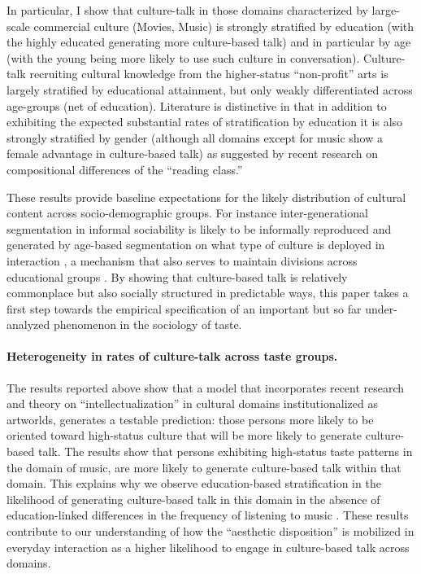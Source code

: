 In particular, I show that culture-talk in those domains characterized by large-scale commercial culture (Movies, Music) is strongly stratified by education (with the highly educated generating more culture-based talk) and in particular by age (with the young being more likely to use such culture in conversation). Culture-talk recruiting cultural knowledge from the higher-status ``non-profit'' arts is largely stratified by educational attainment, but only weakly differentiated across age-groups (net of education).  Literature is distinctive in that in addition to exhibiting the expected substantial rates of stratification by education it is also strongly stratified by gender (although all domains except for music show a female advantage in culture-based talk) as suggested by recent research on compositional differences of the ``reading class.''  

These results provide baseline expectations for the likely distribution of cultural content across socio-demographic groups.  For instance inter-generational segmentation in informal sociability is likely to be informally reproduced and generated by age-based segmentation on what type of culture is deployed in interaction \citep{milner04}, a mechanism that also serves to maintain divisions across educational groups \citep{collins75}.   By showing that culture-based talk is relatively commonplace but also socially structured in predictable ways, this paper takes a first step towards the empirical specification of an important but so far under-analyzed phenomenon in the sociology of taste.  

\paragraph{Heterogeneity in rates of culture-talk across taste groups.}
The results reported above show that a model that incorporates recent research and theory on ``intellectualization'' in cultural domains institutionalized as artworlds, generates a testable prediction: those persons more likely to be oriented toward high-status culture that will be more likely to generate culture-based talk. The results show that persons exhibiting high-status taste patterns in the domain of music, are more likely to generate culture-based talk within that domain.  This explains why we observe education-based stratification in the likelihood of generating culture-based talk in this domain in the absence of education-linked differences in the frequency of listening to music \citep{denora00}. These results contribute to our understanding of how the ``aesthetic disposition'' is mobilized in everyday interaction as a higher likelihood to engage in culture-based talk across domains. 

